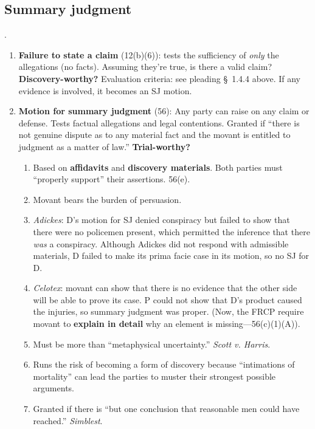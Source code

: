 \subsection{Summary judgment}.

\begin{enumerate}
    \item \textbf{Failure to state a claim} (12(b)(6)): tests the sufficiency 
    of \emph{only} the allegations (no facts). Assuming they're true, is there 
    a valid claim? \textbf{Discovery-worthy?} Evaluation criteria: see 
    pleading \S\ 1.4.4 above. If any evidence is involved, it becomes an SJ 
    motion.
    \item \textbf{Motion for summary judgment} (56): Any party can raise on 
    any claim or defense. Tests factual allegations and legal contentions.  
    Granted if ``there is not genuine dispute as to any material fact and the 
    movant is entitled to judgment as a matter of law.'' 
    \textbf{Trial-worthy?}
    \begin{enumerate}
        \item Based on \textbf{affidavits} and \textbf{discovery materials}.  
        Both parties must ``properly support'' their assertions. 56(e).
        \item Movant bears the burden of persuasion.
        \item \emph{Adickes}: D's motion for SJ denied conspiracy but failed 
        to show that there were no policemen present, which permitted the 
        inference that there \emph{was} a conspiracy. Although Adickes did not 
        respond with admissible materials, D failed to make its prima facie 
        case in its motion, so no SJ for D.
        \item \emph{Celotex}: movant can show that there is no evidence that 
        the other side will be able to prove its case. P could not show that 
        D's product caused the injuries, so summary judgment was proper. (Now, 
        the FRCP require movant to \textbf{explain in detail} why an element 
        is missing---56(c)(1)(A)).
        \item Must be more than ``metaphysical uncertainty.'' \emph{Scott v.  
        Harris}.
        \item Runs the risk of becoming a form of discovery because 
        ``intimations of mortality'' can lead the parties to muster their 
        strongest possible arguments.  \item Granted if there is ``but one 
        conclusion that reasonable men could have reached.'' \emph{Simblest}.
    \end{enumerate}
\end{enumerate}

